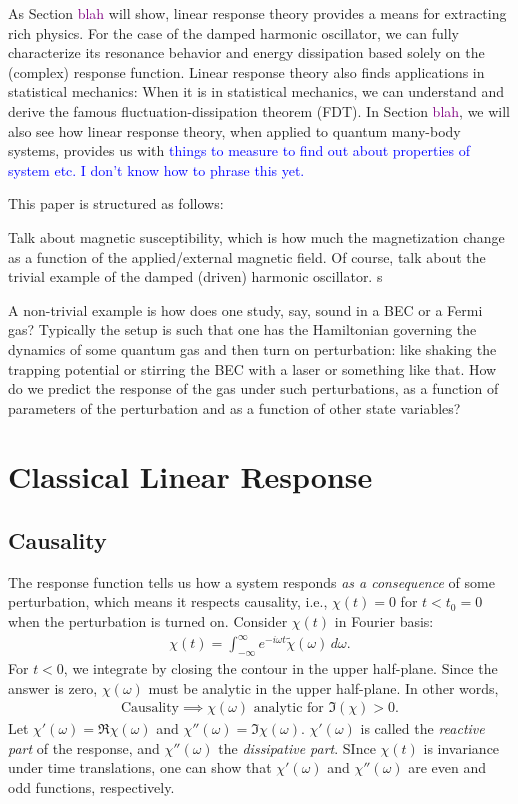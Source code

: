 \documentclass[reprint,
nofootinbib,
amsmath,amssymb,
aps]{revtex4-1}
\begin{document}
As Section \textcolor{purple}{blah} will show, linear response theory provides a means for extracting rich physics. For the case of the damped harmonic oscillator, we can fully characterize its resonance behavior and energy dissipation based solely on the (complex) response function. Linear response theory also finds applications in statistical mechanics: When it is in statistical mechanics, we can understand and derive the famous fluctuation-dissipation theorem (FDT). In Section \textcolor{purple}{blah}, we will also see how linear response theory, when applied to quantum many-body systems, provides us with \textcolor{blue}{things to measure to find out about properties of system etc. I don't know how to phrase this yet.}



This paper is structured as follows: 

Talk about magnetic susceptibility, which is how much the magnetization change as a function of the applied/external magnetic field. Of course, talk about the trivial example of the damped (driven) harmonic oscillator. s

A non-trivial example is how does one study, say, sound in a BEC or a Fermi gas? Typically the setup is such that one has the Hamiltonian governing the dynamics of some quantum gas and then turn on perturbation: like shaking the trapping potential or stirring the BEC with a laser or something like that. How do we predict the response of the gas under such perturbations, as a function of parameters of the perturbation and as a function of other state variables? 



\section{Classical Linear Response}

%
\subsection{Causality}
The response function tells us how a system responds \textit{as a consequence} of some perturbation, which means it respects causality, i.e., $\chi(t) = 0$ for $t < t_0 = 0$ when the perturbation is turned on. Consider $\chi(t)$ in Fourier basis:
\begin{align*}
\chi(t) = \int_{-\infty}^\infty  e^{-i\omega t } \tilde{\chi}(\omega) \,d\omega.
\end{align*}
For $t<0$, we integrate by closing the contour in the upper half-plane. Since the answer is zero, $\chi(\omega)$ must be analytic in the upper half-plane. In other words, 
\begin{align*}
\text{Causality} \implies \chi(\omega) \text{ analytic for } \Im(\chi) > 0.
\end{align*}
Let $\chi'(\omega) = \Re \chi(\omega)$ and $\chi''(\omega) = \Im \chi(\omega)$. $\chi'(\omega)$ is called the \textit{reactive part} of the response, and $\chi''(\omega)$ the \textit{dissipative part}. SInce $\chi(t)$ is invariance under time translations, one can show that $\chi'(\omega)$ and $\chi''(\omega)$ are even and odd functions, respectively.
\end{document}
